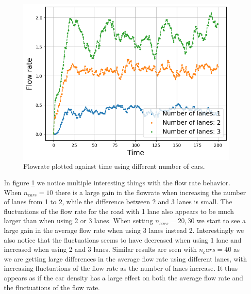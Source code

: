 \documentclass[a4paper,12pt]{article}
\begin{document}
\begin{figure}[H]
\begin{minipage}{.5\textwidth}
    \end{minipage}
    \centering
    \begin{minipage}{.5\textwidth}
        \centering
        \includegraphics[scale=0.47]{Images/flowrate time 50 cars.png}
    \end{minipage}%
    \caption{Flowrate plotted against time using different number of cars.}
    \label{flowrate}
\end{figure}
In figure \ref*{flowrate} we notice multiple interesting things with the flow rate behavior. When $n_{cars}=10$ there is a large gain in the flowrate when increasing
the number of lanes from 1 to 2, while the difference between 2 and 3 lanes is small. The fluctuations of the flow rate for the road with 1 lane also
appears to be much larger than when using 2 or 3 lanes. When setting $n_{cars}=20, 30$ we start to see a large gain in the average flow rate when using 3 lanes instead 2.
Interestingly we also notice that the fluctuations seems to have decreased when using 1 lane and increased when using 2 and 3 lanes. Similar results are seen with $n_cars = 40$
as we are getting large differences in the average flow rate using different lanes, with increasing fluctuations of the flow rate as the number of lanes increase.
It thus appears as if the car density has a large effect on both the average flow rate and the fluctuations of the flow rate.
\end{document}
